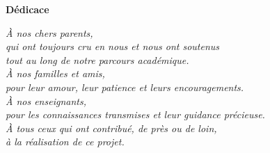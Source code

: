 \clearpage
\thispagestyle{empty}

\begin{center}
{\fontsize{24}{29}\selectfont\bfseries Dédicace}
\end{center}

\vspace{2cm}

\begin{center}
{\fontsize{16}{20}\selectfont\itshape
À nos chers parents,\\[0.5cm]
qui ont toujours cru en nous et nous ont soutenus\\
tout au long de notre parcours académique.\\[0.5cm]
À nos familles et amis,\\[0.5cm]
pour leur amour, leur patience et leurs encouragements.\\[0.5cm]
À nos enseignants,\\[0.5cm]
pour les connaissances transmises et leur guidance précieuse.\\[0.5cm]
À tous ceux qui ont contribué, de près ou de loin,\\
à la réalisation de ce projet.
}
\end{center}

\clearpage
